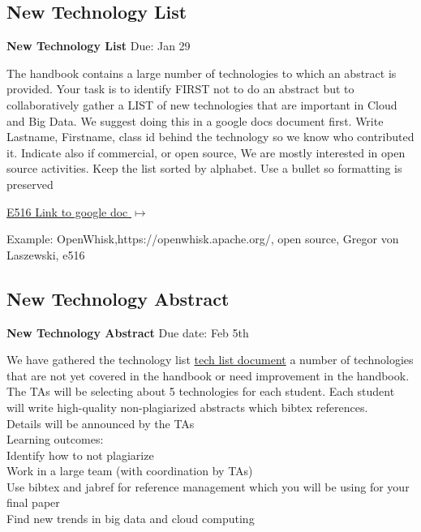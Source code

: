\subsection{New Technology List}

\begin{exercise} \label{a:e516-new-tech-list}

{\bf New Technology List} Due: Jan 29

The handbook contains a large number of technologies to which an abstract is provided. Your task is to identify FIRST not to do an abstract but to collaboratively gather a LIST of new technologies that are important in Cloud and Big Data. We suggest doing this in a google docs document first. Write Lastname, Firstname, class id behind the technology so we know who contributed it. Indicate also if commercial, or open source, We are mostly interested in open source activities. Keep the list sorted by alphabet. Use a bullet so formatting is preserved

 
{\hfill \href{https://docs.google.com/document/d/1LeHGHTSBbaPXYVor0efhmi5W7JJjS7EQHABHqgRAPuU/edit?usp=sharing}{E516 Link to google doc $\mapsto$}}
 
Example: OpenWhisk,https://openwhisk.apache.org/, open source, Gregor von Laszewski, e516
 
\end{exercise}

\subsection{New Technology Abstract}

\begin{exercise} \label{a:e516-new-tech-abstracts}

{\bf New Technology Abstract}
Due date: Feb 5th

We have gathered the technology list \href{https://piazza.com/class/jbkvbp3ed3m2ez?cid=50}{tech list document} a number of technologies that are not yet covered in the handbook or need improvement in the handbook.\\

The TAs will be selecting about 5 technologies for each student. Each student will write high-quality non-plagiarized abstracts which bibtex references.\\
 
Details will be announced by the TAs\\
 
Learning outcomes:\\

\noindent Identify how to not plagiarize\\
Work in a large team (with coordination by TAs)\\
Use bibtex and jabref for reference management which you will be using for your final paper\\
Find new trends in big data and cloud computing\\

\end{exercise}

